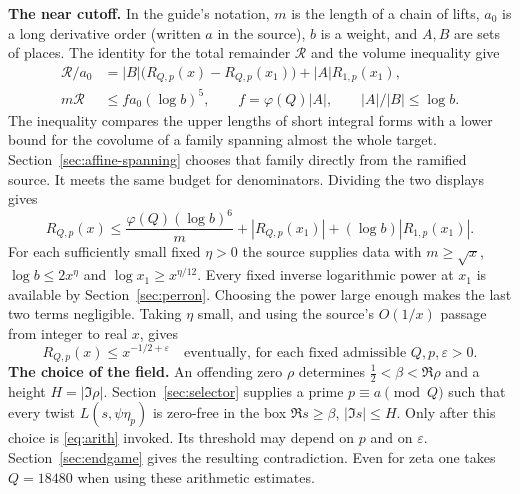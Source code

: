 \documentclass[11pt,letterpaper]{article}
\newcommand{\Half}{\tfrac12}
\newcommand{\e}{\varepsilon}
\begin{document}
\textbf{The near cutoff.} In the guide's notation, $m$ is the length of a chain of lifts, $a_0$ is a long derivative order (written $a$ in the source), $b$ is a weight, and $A,B$ are sets of places. The identity for the total remainder $\mathcal R$ and the volume inequality give
\begin{align*}
 \mathcal R/a_0
   &=|B|\big(R_{Q,p}(x)-R_{Q,p}(x_1)\big)+|A|R_{1,p}(x_1),\\
 m\mathcal R&\le f a_0(\log b)^5,\qquad
 f=\varphi(Q)|A|,\qquad |A|/|B|\le\log b .
\end{align*}
The inequality compares the upper lengths of short integral forms with a lower bound for the covolume of a family spanning almost the whole target. Section~\ref{sec:affine-spanning} chooses that family directly from the ramified source. It meets the same budget for denominators. Dividing the two displays gives
\[
 R_{Q,p}(x)\le \frac{\varphi(Q)(\log b)^6}{m}
             +|R_{Q,p}(x_1)|+(\log b)|R_{1,p}(x_1)|.
\]
For each sufficiently small fixed $\eta>0$ the source supplies data with $m\ge\sqrt x$, $\log b\le2x^\eta$ and $\log x_1\ge x^{\eta/12}$. Every fixed inverse logarithmic power at $x_1$ is available by Section~\ref{sec:perron}. Choosing the power large enough makes the last two terms negligible. Taking $\eta$ small, and using the source's $O(1/x)$ passage from integer to real $x$, gives
\begin{equation}
 R_{Q,p}(x)\le x^{-1/2+\e}\quad\text{eventually, for each fixed admissible } Q,p,\e>0 .
 \label{eq:arith}
\end{equation}
\textbf{The choice of the field.} An offending zero $\rho$ determines $\Half<\beta<\Re\rho$ and a height $H=|\Im\rho|$. Section~\ref{sec:selector} supplies a prime $p\equiv a\pmod Q$ such that every twist $L(s,\psi\eta_p)$ is zero-free in the box $\Re s\ge\beta$, $|\Im s|\le H$. Only after this choice is \eqref{eq:arith} invoked. Its threshold may depend on $p$ and on $\e$. Section~\ref{sec:endgame} gives the resulting contradiction. Even for zeta one takes $Q=18480$ when using these arithmetic estimates.

\clearpage
\end{document}
